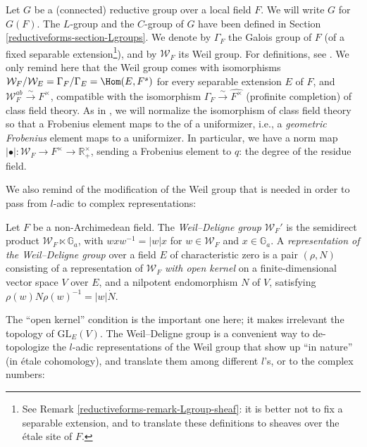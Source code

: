 Let $G$ be a (connected) reductive group over a local field $F$. We will write $G$ for $G(F)$. The $L$-group and the $C$-group of $G$ have been defined in Section \ref{reductiveforms-section-Lgroups}. We denote by $\Gamma_F$ the Galois group of $F$ (of a fixed separable extension\footnote{See Remark \ref{reductiveforms-remark-Lgroup-sheaf}: it is better not to fix a separable extension, and to translate these definitions to sheaves over the \'etale site of $F$.}), and by $\mathcal W_F$ its Weil group. For definitions, see \cite{Tate-Corvallis}. We only remind here that the Weil group comes with isomorphisms $\mathcal W_F/\mathcal W_E = \Gamma_F/\Gamma_E = \Hom(E,F^s)$ for every separable extension $E$ of $F$, and $\mathcal W_F^{ab}\xrightarrow\sim F^\times$, compatible with the isomorphism $\Gamma_F \xrightarrow\sim \widehat{F^\times}$ (profinite completion) of class field theory. As in \cite{Tate-Corvallis}, we will normalize the isomorphism of class field theory so that a Frobenius element maps to the  of a uniformizer, i.e., a \emph{geometric Frobenius} element maps to a uniformizer. In particular, we have a norm map $|\bullet|: \mathcal W_F \to  F^\times \to \mathbb R_+^\times$, sending a Frobenius element to $q$: the degree of the residue field.

We also remind of the modification of the Weil group that is needed in order to pass from $l$-adic to complex representations:

\begin{definition}
 \label{definition-Weil-Deligne}
Let $F$ be a non-Archimedean field. The {\it Weil--Deligne group} $\mathcal W_F'$ is the semidirect product $\mathcal W_F\ltimes \mathbb G_a$, with $w x w^{-1} = |w| x$ for $w\in \mathcal W_F$ and $x\in \mathbb G_a$. A {\it representation of the Weil--Deligne group} over a field $E$ of characteristic zero is a pair $(\rho, N)$ consisting of a representation of $\mathcal W_F$ \emph{with open kernel} on a finite-dimensional vector space $V$ over $E$, and a nilpotent endomorphism $N$ of $V$, satisfying $\rho(w)N\rho(w)^{-1} = |w|\dot N$. 
\end{definition}

The ``open kernel'' condition is the important one here; it makes irrelevant the topology of $\text{GL}_E(V)$. The Weil--Deligne group is a convenient way to de-topologize the $l$-adic representations of the Weil group that show up ``in nature'' (in \'etale cohomology), and translate them among different $l$'s, or to the complex numbers:

